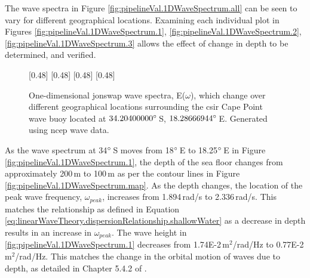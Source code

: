 The wave spectra in Figure \ref{fig:pipelineVal.1DWaveSpectrum.all} can be seen to vary for different geographical locations. Examining each individual plot in Figures \ref{fig:pipelineVal.1DWaveSpectrum.1}, \ref{fig:pipelineVal.1DWaveSpectrum.2}, \ref{fig:pipelineVal.1DWaveSpectrum.3} allows the effect of change in depth to be determined, and verified.

\begin{figure}[H]
    \centering
    [0.48\linewidth]{
        \resizebox{\linewidth}{!}{}
    }
    [0.48\linewidth]{
        \resizebox{\linewidth}{!}{}
    }
    [0.48\linewidth]{
        \resizebox{\linewidth}{!}{}
    }    
    [0.48\linewidth]{
        \resizebox{\linewidth}{!}{}
    }    
    \caption{One-dimensional \acs{jonswap} wave spectra, E($\omega$), which change over different geographical locations surrounding the \acs{csir} Cape Point wave buoy located at $34.20400000\degree$\,S, $18.28666944\degree$\,E. Generated using \acs{ncep} wave data.}
    \label{fig:pipelineVal.1DWaveSpectrum}
\end{figure}

As the wave spectrum at 34$\degree$\,S moves from 18$\degree$\,E to 18.25$\degree$\,E in Figure \ref{fig:pipelineVal.1DWaveSpectrum.1}, the depth of the sea floor changes from approximately 200\,m to 100\,m as per the contour lines in Figure \ref{fig:pipelineVal.1DWaveSpectrum.map}. As the depth changes, the location of the peak wave frequency, $\omega_{peak}$, increases from 1.894\,rad/s to 2.336\,rad/s. This matches the relationship as defined in Equation \ref{eq:linearWaveTheory.dispersionRelationship.shallowWater} as a decrease in depth results in an increase in $\omega_{peak}$. The wave height in \ref{fig:pipelineVal.1DWaveSpectrum.1} decreases from 1.74E-2\,m$^2$/rad/Hz to 0.77E-2\,m$^2$/rad/Hz. This matches the change in the orbital motion of waves due to depth, as detailed in Chapter 5.4.2 of \cite{Holthuijsen2007}. 

